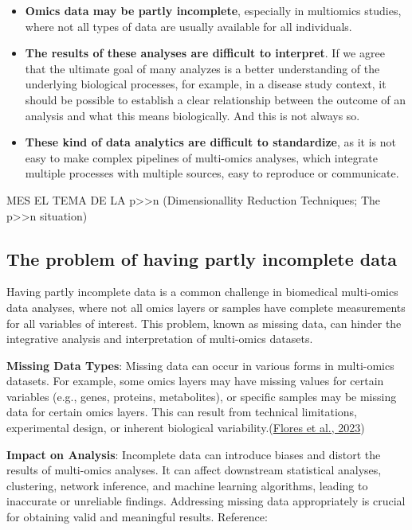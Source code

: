 \documentclass[a4paper, nobind]{templates/ociamthesis}
\begin{document}
\begin{itemize}
\item
  \textbf{Omics data may be partly incomplete}, especially in multiomics studies, where not all types of data are usually available for all individuals.
\item
  \textbf{The results of these analyses are difficult to interpret}. If we agree that the ultimate goal of many analyzes is a better understanding of the underlying biological processes, for example, in a disease study context, it should be possible to establish a clear relationship between the outcome of an analysis and what this means biologically. And this is not always so.
\item
  \textbf{These kind of data analytics are difficult to standardize}, as it is not easy to make complex pipelines of multi-omics analyses, which integrate multiple processes with multiple sources, easy to reproduce or communicate.
\end{itemize}

MES EL TEMA DE LA p\textgreater\textgreater n (Dimensionallity Reduction Techniques; The p\textgreater\textgreater n situation)

\hypertarget{the-problem-of-having-partly-incomplete-data}{%
\subsection{The problem of having partly incomplete data}\label{the-problem-of-having-partly-incomplete-data}}

Having partly incomplete data is a common challenge in biomedical multi-omics data analyses, where not all omics layers or samples have complete measurements for all variables of interest. This problem, known as missing data, can hinder the integrative analysis and interpretation of multi-omics datasets.

\textbf{Missing Data Types}: Missing data can occur in various forms in multi-omics datasets. For example, some omics layers may have missing values for certain variables (e.g., genes, proteins, metabolites), or specific samples may be missing data for certain omics layers. This can result from technical limitations, experimental design, or inherent biological variability.(\protect\hyperlink{ref-flores_missing_2023}{Flores et al., 2023})

\textbf{Impact on Analysis}: Incomplete data can introduce biases and distort the results of multi-omics analyses. It can affect downstream statistical analyses, clustering, network inference, and machine learning algorithms, leading to inaccurate or unreliable findings. Addressing missing data appropriately is crucial for obtaining valid and meaningful results. Reference:
\end{document}
